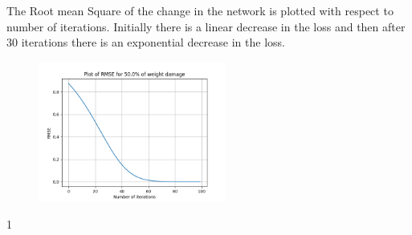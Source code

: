 \documentclass{article}
\begin{document}
\begin{figure}[H]
\hspace{0.001\textwidth}
\end{figure}


The Root mean Square of the change in the network is plotted with respect to number of iterations. Initially there is a linear decrease in the loss and then after 30 iterations there is an exponential decrease in the loss.
\begin{figure}[H]
\includegraphics[width=0.55\textwidth]{cat_22.png}
\centering
\end{figure}1
\end{document}
